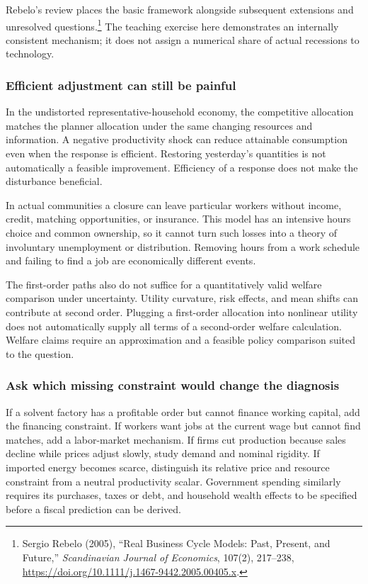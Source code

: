 Rebelo's review places the basic framework alongside subsequent extensions
and unresolved questions.\footnote{Sergio Rebelo (2005), ``Real Business Cycle
Models: Past, Present, and Future,'' \textit{Scandinavian Journal of Economics},
107(2), 217--238, \url{https://doi.org/10.1111/j.1467-9442.2005.00405.x}.}
The teaching exercise here demonstrates an internally consistent mechanism;
it does not assign a numerical share of actual recessions to technology.

\subsubsection{Efficient adjustment can still be painful}

In the undistorted representative-household economy, the competitive allocation
matches the planner allocation under the same changing resources and information.
A negative productivity shock can reduce attainable consumption even when the
response is efficient. Restoring yesterday's quantities is not automatically a
feasible improvement. Efficiency of a response does not make the disturbance
beneficial.

In actual communities a closure can leave particular workers without income,
credit, matching opportunities, or insurance. This model has an intensive hours
choice and common ownership, so it cannot turn such losses into a theory of
involuntary unemployment or distribution. Removing hours from a work schedule
and failing to find a job are economically different events.

The first-order paths also do not suffice for a quantitatively valid welfare
comparison under uncertainty. Utility curvature, risk effects, and mean shifts
can contribute at second order. Plugging a first-order allocation into nonlinear
utility does not automatically supply all terms of a second-order welfare
calculation. Welfare claims require an approximation and a feasible policy
comparison suited to the question.

\subsubsection{Ask which missing constraint would change the diagnosis}

If a solvent factory has a profitable order but cannot finance working capital,
add the financing constraint. If workers want jobs at the current wage but
cannot find matches, add a labor-market mechanism. If firms cut production
because sales decline while prices adjust slowly, study demand and nominal
rigidity. If imported energy becomes scarce, distinguish its relative price
and resource constraint from a neutral productivity scalar. Government spending
similarly requires its purchases, taxes or debt, and household wealth effects
to be specified before a fiscal prediction can be derived.

